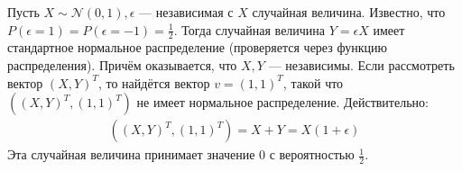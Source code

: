 Пусть $X \sim \mathcal{N}(0, 1), \epsilon$ --- независимая с $X$ случайная величина. Известно, что
$P(\epsilon = 1) = P(\epsilon = -1) = \frac{1}{2}$. Тогда случайная величина $Y = \epsilon X$
имеет стандартное нормальное распределение (проверяется через функцию распределения). Причём
оказывается, что $X, Y$ --- независимы.
Если рассмотреть вектор $(X, Y)^T$, то найдётся вектор $v = (1, 1)^T$, такой что
$\left( (X, Y)^T, (1, 1)^T \right)$ не имеет нормальное распределение.
Действительно:
\begin{align*}
    \left( (X, Y)^T, (1, 1)^T \right) = X + Y = X(1 + \epsilon)
\end{align*}
Эта случайная величина принимает значение $0$ с вероятностью $\frac{1}{2}$.